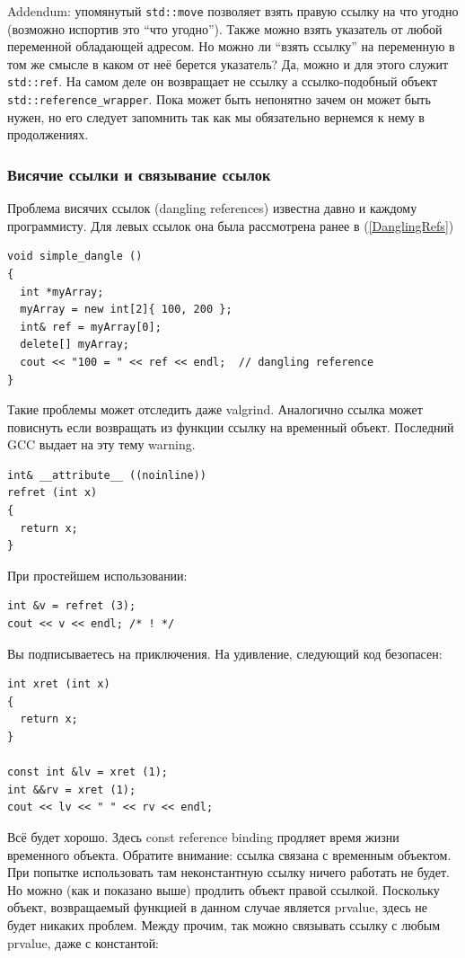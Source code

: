 \documentclass[a4paper,12pt,oneside]{article}
\begin{document}
Addendum: упомянутый \lstinline!std::move! позволяет взять правую ссылку на что угодно (возможно испортив это ``что угодно''). Также можно взять указатель от любой переменной обладающей адресом. Но можно ли ``взять ссылку'' на переменную в том же смысле в каком от неё берется указатель? Да, можно и для этого служит \lstinline!std::ref!. На самом деле он возвращает не ссылку а ссылко-подобный объект \lstinline!std::reference_wrapper!. Пока может быть непонятно зачем он может быть нужен, но его следует запомнить так как мы обязательно вернемся к нему в продолжениях.

\subsubsection{Висячие ссылки и связывание ссылок}\label{DanglingRRefs}

Проблема висячих ссылок (dangling references) известна давно и каждому программисту. Для левых ссылок она была рассмотрена ранее в (\ref{DanglingRefs})

\begin{lstlisting}
void simple_dangle ()
{
  int *myArray;
  myArray = new int[2]{ 100, 200 };
  int& ref = myArray[0];
  delete[] myArray;
  cout << "100 = " << ref << endl;  // dangling reference  
}
\end{lstlisting}

Такие проблемы может отследить даже valgrind. Аналогично ссылка может повиснуть если возвращать из функции ссылку на временный объект. Последний GCC выдает на эту тему warning.

\begin{lstlisting}
int& __attribute__ ((noinline))
refret (int x)
{
  return x;
}
\end{lstlisting}

При простейшем использовании:

\begin{lstlisting}
int &v = refret (3);
cout << v << endl; /* ! */
\end{lstlisting}

Вы подписываетесь на приключения. На удивление, следующий код безопасен:

\begin{lstlisting}
int xret (int x)
{
  return x;
}

const int &lv = xret (1);
int &&rv = xret (1);
cout << lv << " " << rv << endl;
\end{lstlisting}

Всё будет хорошо. Здесь const reference binding продляет время жизни временного объекта. Обратите внимание: ссылка связана с временным объектом. При попытке использовать там неконстантную ссылку ничего работать не будет. Но можно (как и показано выше) продлить объект правой ссылкой. Поскольку объект, возвращаемый функцией в данном случае является prvalue, здесь не будет никаких проблем. Между прочим, так можно связывать ссылку с любым prvalue, даже с константой:
\end{document}
